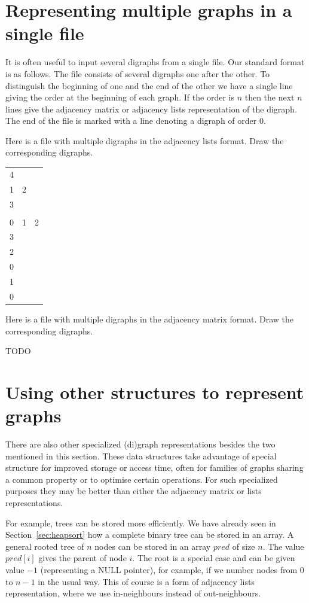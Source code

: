\section{Representing multiple graphs in a single file}

It is often useful to input several digraphs from a single file. Our
standard format is as follows. The file consists of several digraphs 
one after the other. To distinguish the beginning of one and the end of
the other we have a single line giving the order at the beginning of
each graph. If the order is $n$ then the next $n$ lines give the
adjacency matrix or adjacency lists representation of the digraph. 
The end of the file is marked with a line denoting a digraph of order
$0$.

\beginboxedexample
Here is a file with multiple digraphs in the adjacency lists format.  Draw the corresponding digraphs.

\begin{tabular}{lll}
4 \\
1 & 2  \\
3 & \\
&  \\
0 & 1 & 2 \\
3 \\
2 \\
0 \\
1 \\
0\\
\end{tabular}

\endboxedexample{3cm}

\beginboxedexample
Here is a file with multiple digraphs in the adjacency matrix format.  Draw the corresponding digraphs.

TODO

\endboxedexample{3cm}

\section{Using other structures to represent graphs}

There are also other specialized (di)graph representations besides the
two mentioned in this section.  These data structures take advantage of
special structure for improved storage or access time, often for
families of graphs sharing a common property or to optimise certain operations. For such specialized
purposes they may be better than either the adjacency matrix or lists
representations.

For example, trees can be stored more efficiently. We have already
seen in Section~\ref{sec:heapsort} how a complete binary tree can be
stored in an array. A general rooted tree of $n$ nodes can be stored in
an array $pred$ of size $n$. The value $pred[i]$ gives the parent of
node $i$. The root is a special case and can be given value $-1$
(representing a NULL pointer), for example, if we number nodes from $0$
to $n-1$ in the usual way. This of course is a form of adjacency lists
representation, where we use in-neighbours instead of out-neighbours.

